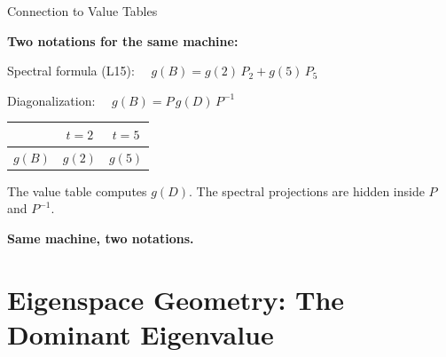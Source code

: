 \documentclass[10pt]{beamer}
\theoremstyle{definition}
\newcommand{\x}[1]{\alert{\textbf{#1}}}
\begin{document}
\begin{frame}{Connection to Value Tables}

\x{Two notations for the same machine:}

\vfill

Spectral formula (L15): $\quad g(B) = g(2)\, P_2 + g(5)\, P_5$

\vfill

Diagonalization: $\quad g(B) = P\,g(D)\,P^{-1}$

\vfill\pause

\begin{center}
\renewcommand{\arraystretch}{1.3}
\begin{tabular}{c|cc}
 & $t = 2$ & $t = 5$ \\
\hline
$g(B)$ & $g(2)$ & $g(5)$
\end{tabular}
\end{center}

\vfill

The value table computes $g(D)$. The spectral projections are hidden inside $P$ and $P^{-1}$.

\vfill

\x{Same machine, two notations.}

\end{frame}


\section{Eigenspace Geometry: The Dominant Eigenvalue}
\end{document}
